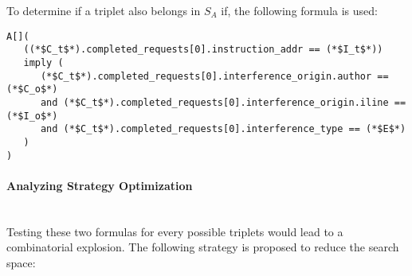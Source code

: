 To determine if a triplet also belongs in $S_A$ if, the following formula is
used:
\begin{lstlisting}
A[](
   ((*$C_t$*).completed_requests[0].instruction_addr == (*$I_t$*))
   imply (
      (*$C_t$*).completed_requests[0].interference_origin.author == (*$C_o$*)
      and (*$C_t$*).completed_requests[0].interference_origin.iline == (*$I_o$*)
      and (*$C_t$*).completed_requests[0].interference_type == (*$E$*)
   )
)
\end{lstlisting}

\paragraph*{Analyzing Strategy Optimization}~~\\
Testing these two formulas for every possible triplets would lead to a
combinatorial explosion. The following strategy is proposed to reduce the
search space:
